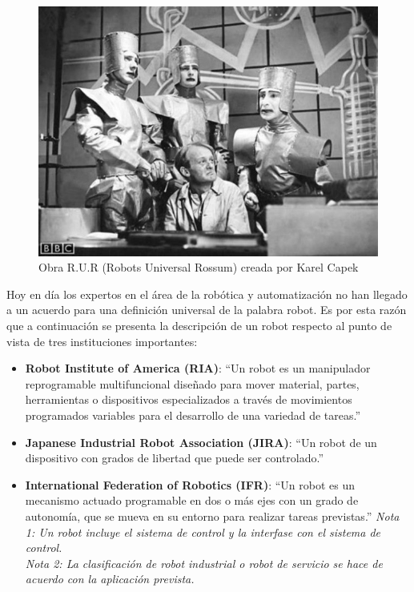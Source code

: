     \begin{figure}[htb]
        \centering
        \includegraphics[width=0.6\linewidth]{Main/Chapter2/Images2/Obra-robots.jpg}
        \caption{Obra R.U.R (Robots Universal Rossum) creada por Karel Capek \cite{cap2_rur}}
        \label{f:Cap2_general_2}
    \end{figure}
    
    Hoy en día los expertos en el área de la robótica y automatización no han llegado a un acuerdo para una definición universal de la palabra robot. Es por esta razón que a continuación se presenta la descripción de un robot respecto al punto de vista de tres instituciones importantes:
    
    \begin{itemize}
    
        \item \textbf{Robot Institute of America (RIA)}: ``Un robot es un manipulador reprogramable multifuncional diseñado para mover material, partes, herramientas o dispositivos especializados a través de movimientos programados variables para el desarrollo de una variedad de tareas.''
        
        \item \textbf{Japanese Industrial Robot Association (JIRA)}: ``Un robot de un dispositivo con grados de libertad que puede ser controlado.''
        
        \item \textbf{International Federation of Robotics (IFR)}: ``Un robot es un mecanismo actuado programable en dos o más ejes con un grado de autonomía, que se mueva en su entorno para realizar tareas previstas.''
        \textit{Nota 1: Un robot incluye el sistema de control y la interfase con el sistema de control.}\\
        \textit{Nota 2: La clasificación de robot industrial o robot de servicio se hace de acuerdo con la aplicación prevista.}
        
    \end{itemize}
    
